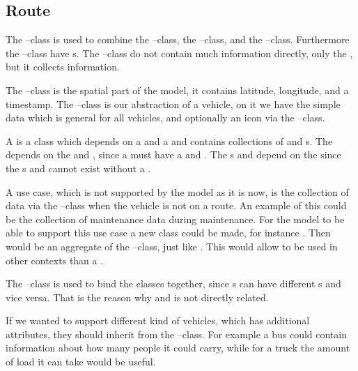 
\subsection{Route}
The --class is used to combine the --class, the --class, and the --class.
Furthermore the --class have s.
The --class do not contain much information directly, only the , but it collects information.

The --class is the spatial part of the model, it contains latitude, longitude, and a timestamp.
The --class is our abstraction of a vehicle, on it we have the simple data which is general for all vehicles, and optionally an icon via the --class.

A  is a class which depends on a  and a  and contains collections of  and s.
The  depends on the  and , since a  must have a  and .
The s and  depend on the  since the s and  cannot exist without a .

A use case, which is not supported by the model as it is now, is the collection of data via the --class when the vehicle is not on a route.
An example of this could be the collection of maintenance data during maintenance.
For the model to be able to support this use case a new class could be made, for instance .
Then  would be an aggregate of the --class, just like .
This would allow  to be used in other contexts than a .

The --class is used to bind the classes together, since s can have different s and vice versa.
That is the reason why  and  is not directly related. 

If we wanted to support different kind of vehicles, which has additional attributes, they should inherit from the --class.
For example a bus could contain information about how many people it could carry, while for a truck the amount of load it can take would be useful. 

